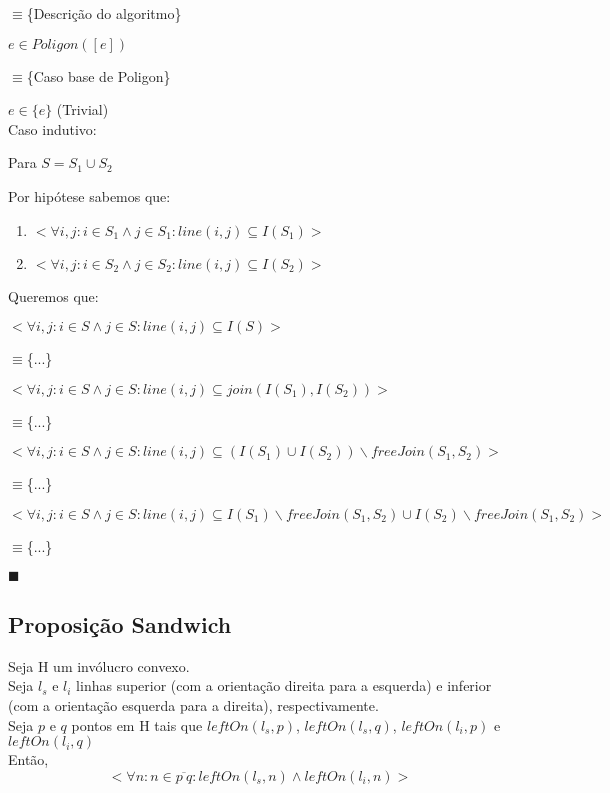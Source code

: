 \documentclass[11pt]{article}
\begin{document}
    $\equiv$\{Descrição do algoritmo\}\par
    $e \in Poligon([e])$\par
    $\equiv$\{Caso base de Poligon\}\par
    $e \in \{e\}$ (Trivial)\\
Caso indutivo:\par
    Para $S = S_1 \cup S_2$\par
    Por hipótese sabemos que:\par
    \begin{enumerate}
        \item 
            $<\forall i,j : i \in S_1 \wedge j \in S_1 : 
                line(i,j) \subseteq I(S_1)
            >$
        \item 
            $<\forall i,j : i \in S_2 \wedge j \in S_2 : 
                line(i,j) \subseteq I(S_2)
            >$
    \end{enumerate}\par
    Queremos que:\par
    $<\forall i,j : i \in S \wedge j \in S : 
        line(i,j) \subseteq I(S)
    >$\par
    $\equiv$\{...\}\par
    $< \forall i,j : i \in S \wedge j \in S : 
        line(i,j) \subseteq join(I(S_1),I(S_2))
    >$\par
    $\equiv$\{...\}\par
    $< \forall i,j : i \in S \wedge j \in S : 
        line(i,j) \subseteq (I(S_1) \cup I(S_2)) \backslash freeJoin(S_1, S_2)
    >$\par
    $\equiv$\{...\}\par
    $< \forall i,j : i \in S \wedge j \in S : 
        line(i,j) \subseteq I(S_1) \backslash freeJoin(S_1, S_2) \cup I(S_2)\backslash freeJoin(S_1, S_2) 
    >$\par
    $\equiv$\{...\}\par
    

\hfill $\blacksquare$

\subsection{Proposição Sandwich}
Seja H um invólucro convexo.\\
Seja $l_s$ e $l_i$ linhas superior (com a orientação direita para a esquerda) e 
inferior (com a orientação esquerda para a direita), respectivamente.\\
Seja $p$ e $q$ pontos em H tais que $leftOn(l_s, p)$, $leftOn(l_s, q)$, $leftOn(l_i, p)$ e $leftOn(l_i, q)$\\
Então,
        $$<\forall n : n \in \overline{p\ q} : leftOn(l_s, n) \wedge leftOn(l_i, n)>$$
\end{document}
